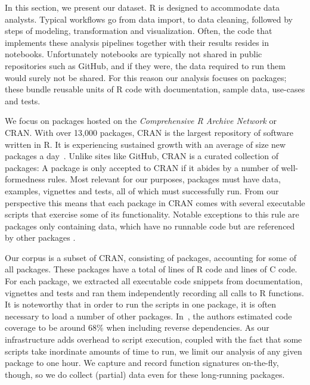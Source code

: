 \documentclass[acmsmall,10pt,review,anonymous]{acmart}\settopmatter{printfolios=true,printccs=false,printacmref=false}
\begin{document}
In this section, we present our dataset. R is designed to accommodate data
analysts.  Typical workflows go from data import, to data cleaning, followed
by steps of modeling, transformation and visualization. Often, the code that
implements these analysis pipelines together with their results resides in
notebooks. Unfortunately notebooks are typically not shared in public
repositories such as GitHub, and if they were, the data required to run them
would surely not be shared. For this reason our analysis focuses on
packages; these bundle reusable units of R code with documentation, sample
data, use-cases and tests.

We focus on packages hosted on the \emph{Comprehensive R Archive Network} or
CRAN.  With over 13,000 packages, CRAN is the largest repository of software
written in R. It is experiencing sustained growth with an average of size
new packages a day~\cite{LIgges2017}.  Unlike sites like GitHub, CRAN is a
curated collection of packages: A package is only accepted to CRAN if it
abides by a number of well-formedness rules.  Most relevant for our
purposes, packages must have data, examples, vignettes and tests, all of
which must successfully run. From our perspective this means that each package 
in CRAN comes with several executable scripts that exercise some of its functionality.
Notable exceptions to this rule are packages only containing data, which have no runnable
code but are referenced by other packages .

Our corpus is a subset of CRAN, consisting of \PACKAGES packages, accounting
for some \PERCENTCRAN of all packages.  These packages have a total of \RLOC
lines of R code and \CLOC lines of C code. For each package, we extracted
all executable code snippets from documentation, vignettes and tests and ran
them independently recording all calls to R functions.  It is noteworthy that
in order to run the scripts in one package, it is often necessary to load a
number of other packages.  In~\cite{issta18}, the authors estimated code
coverage to be around 68\% when including reverse dependencies.  As our infrastructure
adds overhead to script execution, coupled with the fact that some scripts take 
inordinate amounts of time to run, we limit our analysis of any given package to one hour.
We capture and record function signatures on-the-fly, though, so we do collect (partial) data even 
for these long-running packages. 
\end{document}
